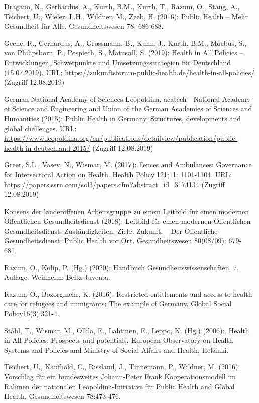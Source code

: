\documentclass{article}
\begin{document}
Dragano, N., Gerhardus, A., Kurth, B.M., Kurth, T., Razum, O., Stang, A., Teichert, U., Wieler, L.H., Wildner, M., Zeeb, H. (2016): Public Health – Mehr Gesundheit für Alle. Gesundheitswesen 78: 686-688. 


Geene, R., Gerhardus, A., Grossmann, B., Kuhn, J., Kurth, B.M., Moebus, S., von Philipsborn, P., Pospiech, S., Matusall, S. (2019): Health in All Policies – Entwicklungen, Schwerpunkte und Umsetzungsstrategien für Deutschland (15.07.2019). URL: \href{https://zukunftsforum-public-health.de/health-in-all-policies/}{https://zukunftsforum-public-health.de/health-in-all-policies/} (Zugriff 12.08.2019) 


German National Academy of Sciences Leopoldina, acatech—National Academy of Science and Engineering and Union of the German Academies of Sciences and Humanities (2015): Public Health in Germany. Structures, developments and global challenges. URL: \href{https://www.leopoldina.org/en/publications/detailview/publication/public-health-in-deutschland-2015/}{https://www.leopoldina.org/en/publications/detailview/publication/public-health-in-deutschland-2015/} (Zugriff 12.08.2019)


Greer, S.L., Vasev, N., Wismar, M. (2017): Fences and Ambulances: Governance for Intersectoral Action on Health. Health Policy 121;11: 1101-1104. URL: \href{https://papers.ssrn.com/sol3/papers.cfm?abstract_id=3174134}{https://papers.ssrn.com/sol3/papers.cfm?abstract\_id=3174134} (Zugriff 12.08.2019)


Konsens der länderoffenen Arbeitsgruppe zu einem Leitbild für einen modernen Öffentlichen Gesundheitsdienst (2018): Leitbild für einen modernen Öffentlichen Gesundheitsdienst: Zuständigkeiten. Ziele. Zukunft. – Der Öffentliche Gesundheitsdienst: Public Health vor Ort. Gesundheitswesen 80(08/09): 679-681. 


Razum, O., Kolip, P. (Hg.) (2020): Handbuch Gesundheitswissenschaften. 7. Auflage. Weinheim: Beltz Juventa.


Razum, O., Bozorgmehr, K. (2016): Restricted entitlements and access to health care for refugees and immigrants: The example of Germany. Global Social Policy16(3):321-4.


Ståhl, T., Wismar, M., Ollila, E., Lahtinen, E., Leppo, K. (Hg.) (2006):. Health in All Policies: Prospects and potentials. European Observatory on Health Systems and Policies and Ministry of Social Affairs and Health, Helsinki.


Teichert, U., Kaufhold, C., Rissland, J., Tinnemann, P., Wildner, M. (2016): Vorschlag für ein bundesweites Johann-Peter Frank Kooperationsmodell im Rahmen der nationalen Leopoldina-Initiative für Public Health and Global Health. Gesundheitswesen 78:473-476.
\end{document}
